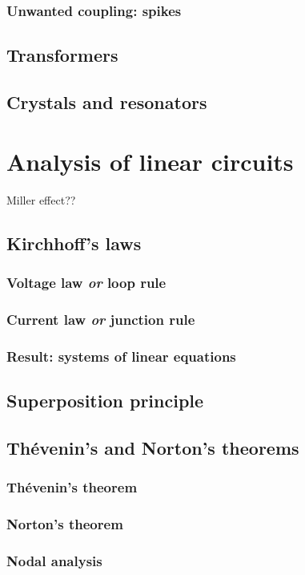 \documentclass{report}
\begin{document}
\subsection{Unwanted coupling: spikes}
\section{Transformers}
\section{Crystals and resonators}

\chapter{Analysis of linear circuits}
Miller effect??
\section{Kirchhoff's laws}
\subsection{Voltage law \textit{or} loop rule}
\subsection{Current law \textit{or} junction rule}
\subsection{Result: systems of linear equations}
\section{Superposition principle}
\section{Thévenin's and Norton's theorems}
\subsection{Thévenin's theorem}
\subsection{Norton's theorem}
\subsection{Nodal analysis}
\end{document}

